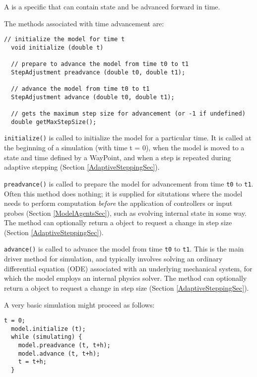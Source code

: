 \documentclass{article}
\begin{document}
A  is a specific
 that can contain
state and be advanced forward in time.

The methods associated with time advancement are:
\begin{lstlisting}[]
  // initialize the model for time t
  void initialize (double t)

  // prepare to advance the model from time t0 to t1
  StepAdjustment preadvance (double t0, double t1);

  // advance the model from time t0 to t1
  StepAdjustment advance (double t0, double t1);

  // gets the maximum step size for advancement (or -1 if undefined)
  double getMaxStepSize();
\end{lstlisting}

{\tt initialize()} is called to initialize the model for a particular
time. It is called at the beginning of a simulation (with time t = 0),
when the model is moved to a state and time defined by a
WayPoint, and when a step is repeated during adaptive stepping
(Section \ref{AdaptiveSteppingSec}).

{\tt preadvance()} is called to prepare the model for advancement from
time {\tt t0} to {\tt t1}. Often this method does nothing; it is
supplied for situtations where the model needs to perform computation
{\it before} the application of controllers or input probes (Section
\ref{ModelAgentsSec}), such as evolving internal state in some way.
The method can optionally return a
 object to request
a change in step size (Section \ref{AdaptiveSteppingSec}).

{\tt advance()} is called to advance the model from time {\tt t0} to
{\tt t1}. This is the main driver method for simulation, and typically
involves solving an ordinary differential equation (ODE) associated
with an underlying mechanical system, for which the model employs an
internal physics solver. The method can optionally return a
 object to request
a change in step size (Section \ref{AdaptiveSteppingSec}).

A very basic simulation might proceed as follows:

\begin{lstlisting}[]
  t = 0;
  model.initialize (t);
  while (simulating) {
    model.preadvance (t, t+h);
    model.advance (t, t+h);
    t = t+h;
  }
\end{lstlisting}
\end{document}
